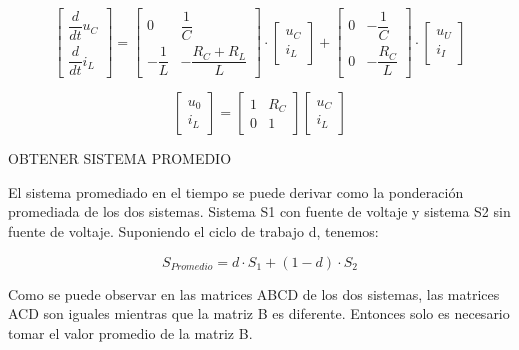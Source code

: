 \begin{equation}
    \begin{bmatrix}
        \dfrac{d}{dt}u_C\\
        \dfrac{d}{dt}i_L
    \end{bmatrix}
    =
    \begin{bmatrix}
        0 & \dfrac{1}{C}\\
        -\dfrac{1}{L} & -\dfrac{R_C + R_L}{L}
    \end{bmatrix}
    \cdot
    \begin{bmatrix}
        u_C\\
        i_L
    \end{bmatrix}
    +
    \begin{bmatrix}
        0 & -\dfrac{1}{C}\\
        0 & -\dfrac{R_C}{L}
    \end{bmatrix}
    \cdot
    \begin{bmatrix}
        u_U\\
        i_I
    \end{bmatrix} 
\end{equation}

\begin{equation}
    \begin{bmatrix}
        u_0\\
        i_L
    \end{bmatrix}
    =
    \begin{bmatrix}
        1 & R_C\\
        0 & 1
    \end{bmatrix}
    \begin{bmatrix}
        u_C\\
        i_L
    \end{bmatrix}
\end{equation}

OBTENER SISTEMA PROMEDIO

El sistema promediado en el tiempo se puede derivar como la ponderación promediada de
los dos sistemas. Sistema S1 con fuente de voltaje y sistema S2
sin fuente de voltaje. Suponiendo el ciclo de trabajo d, tenemos:

\begin{equation}
    S_{Promedio} = d \cdot S_1 + (1 - d) \cdot S_2
\end{equation}

Como se puede observar en las matrices ABCD de los dos sistemas, las matrices ACD
son iguales mientras que la matriz B es diferente.
Entonces solo es necesario tomar el valor promedio de la matriz B.

